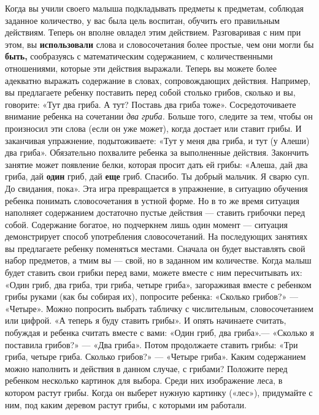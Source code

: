\documentclass{book}
\renewcommand{\emph}[1]{\textit{#1}}
\begin{document}
Когда вы учили своего малыша подкладывать предметы к предметам, соблюдая
заданное количество, у вас была цель воспитан, обучить его правильным
действиям. Теперь он вполне овладел этим действием. Разговаривая с ним
при этом, вы \textbf{использовали} слова и словосочетания более простые,
чем они могли бы \textbf{быть,} сообразуясь с математическим
содержанием, с количественными отношениями, которые эти действия
выражали. Теперь вы можете более адекватно выражать содержание в словах,
сопровождающих действия. Например, вы предлагаете ребенку поставить
перед собой столько грибов, сколько и вы, говорите: «Тут два гриба. А
тут? Поставь два гриба тоже». Сосредоточиваете внимание ребенка на
сочетании \emph{два гриба.} Больше того, следите за тем, чтобы он
произносил эти слова (если он уже может), когда достает или ставит
грибы. И заканчивая упражнение, подытоживаете: «Тут у меня два гриба, и
тут (у Алеши) два гриба». Обязательно похвалите ребенка за выполненные
действия. Закончить занятие может появление белки, которая просит дать
ей грибы: «Алеша, дай два гриба, дай \textbf{один} гриб, дай
\textbf{еще} гриб. Спасибо. Ты добрый мальчик. Я сварю суп. До свидания,
пока». Эта игра превращается в упражнение, в ситуацию обучения ребенка
понимать словосочетания в устной форме. Но в то же время ситуация
наполняет содержанием достаточно пустые действия --- ставить грибочки
перед собой. Содержание богатое, но подчеркнем лишь один момент ---
ситуация демонстрирует способ употребления словосочетаний. На
последующих занятиях вы предлагаете ребенку поменяться местами. Сначала
он будет выставлять свой набор предметов, а тмим вы --- свой, но в
заданном им количестве. Когда малыш будет ставить свои грибки перед
вами, можете вместе с ним пересчитывать их: «Один гриб, два гриба, три
гриба, четыре гриба», загораживая вместе с ребенком грибы руками (как бы
собирая их), попросите ребенка: «Сколько грибов?» --- «Четыре». Можно
попросить выбрать табличку с числительным, словосочетанием или цифрой.
«А теперь я буду ставить грибы». И опять начинаете считать, побуждая и
ребенка считать вместе с вами: «Один гриб, два гриба».--- «Сколько я
поставила грибов?» --- «Два гриба». Потом продолжаете ставить грибы:
«Три гриба, четыре гриба. Сколько грибов?» --- «Четыре гриба». Каким
содержанием можно наполнить и действия в данном случае, с грибами?
Положите перед ребенком несколько картинок для выбора. Среди них
изображение леса, в котором растут грибы. Когда он выберет нужную
картинку («лес»), придумайте с ним, под каким деревом растут грибы, с
которыми им работали.
\end{document}
